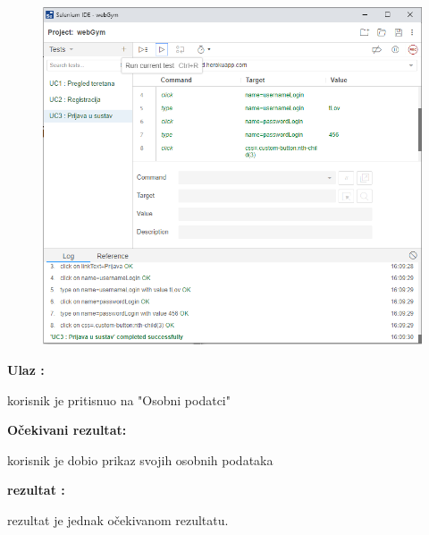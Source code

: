 				\begin{figure}[H]
        			\hspace*{-1.5cm}
        			\includegraphics[scale=0.5]{dijagrami/UC3.PNG} %
        			\centering
        			\label{fig:promjene}
	        	\end{figure}
				
				\noindent {}
                \begin{packed_item}
						\item  \textbf{Ulaz : } 
						\item[] \begin{packed_enum}
	
							\item korisnik je pritisnuo na "Osobni podatci"

						\end{packed_enum}
						\item  \textbf{Očekivani rezultat: } 
						\item[] \begin{packed_enum}
	
							\item korisnik je dobio prikaz svojih osobnih podataka

						\end{packed_enum}
						
						\item  \textbf{rezultat : }
						\item[] \begin{packed_enum}
	
							\item rezultat je jednak očekivanom rezultatu.

						\end{packed_enum}

				\end{packed_item}
		 
